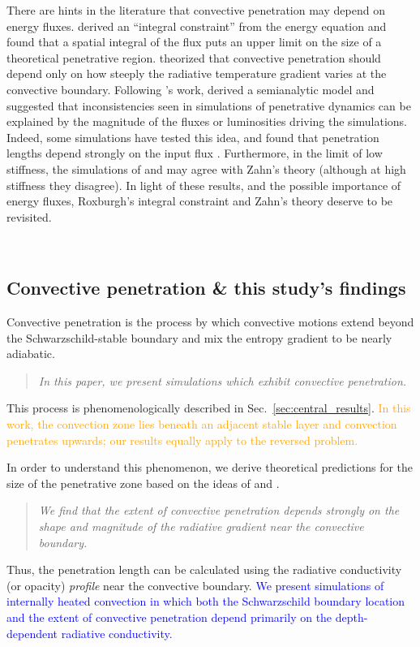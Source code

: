 \documentclass[twocolumn, linenumbers]{aastex631}
\newcommand{\editone}[1]{\textcolor{orange}{#1}}
\newcommand{\edittwo}[1]{\textcolor{blue}{#1}}
\begin{document}
There are hints in the literature that convective penetration may depend on energy fluxes.
\citet{roxburgh1978, roxburgh1989, roxburgh1992, roxburgh1998} derived an ``integral constraint'' from the energy equation and found that a spatial integral of the flux puts an upper limit on the size of a theoretical penetrative region.
\citet{zahn1991} theorized that convective penetration should depend only on how steeply the radiative temperature gradient varies at the convective boundary.
Following \citet{zahn1991}'s work, \citet{rempel2004} derived a semianalytic model and suggested that inconsistencies seen in simulations of penetrative dynamics can be explained by the magnitude of the fluxes or luminosities driving the simulations.
Indeed, some simulations have tested this idea, and found that penetration lengths depend strongly on the input flux \citep{singh_etal_1998, kapyla_etal_2007, tian_etal_2009, hotta2017, kapyla2019}.
Furthermore, in the limit of low stiffness, the simulations of \citet{hurlburt_etal_1994} and \citet{rogers_glatzmaier_2005} may agree with Zahn's theory (although at high stiffness they disagree).
In light of these results, and the possible importance of energy fluxes, Roxburgh's integral constraint and Zahn's theory deserve to be revisited.


$\,$
\subsection{Convective penetration \& this study's findings}

Convective penetration is the process by which convective motions extend beyond the Schwarzschild-stable boundary and mix the entropy gradient to be nearly adiabatic.
\begin{quote}
\emph{
    In this paper, we present simulations which exhibit convective penetration.
}
\end{quote}
This process is phenomenologically described in Sec.~\ref{sec:central_results}.
\editone{
    In this work, the convection zone lies beneath an adjacent stable layer and convection penetrates upwards; our results equally apply to the reversed problem.
}

In order to understand this phenomenon, we derive theoretical predictions for the size of the penetrative zone based on the ideas of \citet{roxburgh1989} and \citet{zahn1991}.
\begin{quote}
\emph{
We find that the extent of convective penetration depends strongly on the shape and magnitude of the radiative gradient near the convective boundary.
}
\end{quote}
Thus, the penetration length can be calculated using the radiative conductivity (or opacity) \emph{profile} near the convective boundary.
\edittwo{
    We present simulations of internally heated convection in which both the Schwarzschild boundary location and the extent of convective penetration depend primarily on the depth-dependent radiative conductivity.
}
\end{document}
